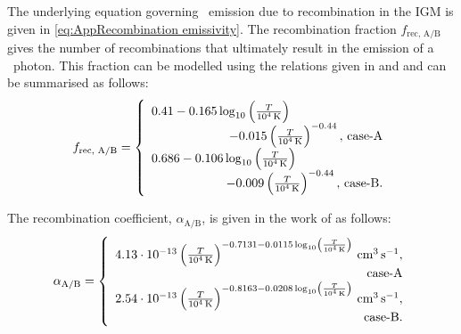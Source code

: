 The underlying equation governing \lya\ emission due to recombination in the IGM is given in \cref{eq:AppRecombination emissivity}. The recombination fraction $f_\text{rec, A/B}$ gives the number of recombinations that ultimately result in the emission of a \lya\ photon. This fraction can be modelled using the relations given in \citet{2008ApJ...672...48C} and \citet{2014PASA...31...40D} and can be summarised as follows:
\begin{equation*}
    f_\text{rec, A/B} = \left\{
    \begin{array}{r}
        \multicolumn{1}{l}{0.41 - 0.165 \log_{10} \left( \frac{T}{10^4 \, \mathrm{K}} \right)} \\
        
        \qquad \qquad \qquad - 0.015 \left( \frac{T}{10^4 \, \mathrm{K}} \right)^{-0.44}, \, \text{case-A} \\
        
        \multicolumn{1}{l}{0.686 - 0.106 \log_{10} \left( \frac{T}{10^4 \, \mathrm{K}} \right)} \\
        
        \qquad \qquad \qquad - 0.009 \left( \frac{T}{10^4 \, \mathrm{K}} \right)^{-0.44}, \, \text{case-B.} \\
    \end{array}
    \right.
\end{equation*}

\noindent The recombination coefficient, $\alpha_\text{A/B}$, is given in the work of \citet{2011piim.book.....D} as follows:
\begin{equation*}
    \alpha_\text{A/B} = \left\{
    \begin{array}{r}
        \multicolumn{1}{l}{4.13 \cdot 10^{-13} \left( \frac{T}{10^4 \, \mathrm{K}} \right)^{-0.7131-0.0115 \log_{10} \left( \frac{T}{10^4 \, \mathrm{K}} \right)} \, \mathrm{cm^{3} \, s^{-1}},} \\
        
        \text{case-A} \\
        
        \multicolumn{1}{l}{2.54 \cdot 10^{-13} \left( \frac{T}{10^4 \, \mathrm{K}} \right)^{-0.8163-0.0208 \log_{10} \left( \frac{T}{10^4 \, \mathrm{K}} \right)} \, \mathrm{cm^{3} \, s^{-1}},} \\
        
        \text{case-B.} \\
    \end{array}
    \right.
\end{equation*}

